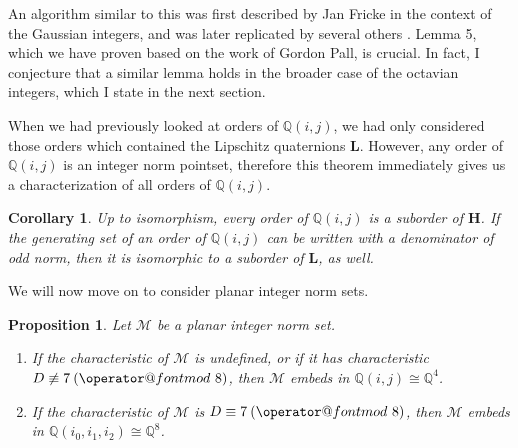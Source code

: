 \documentclass[10pt]{amsart}
\makeatletter
\newcommand{\M}{\mathcal{M}}
\newcommand{\Q}{\mathbb{Q}}
\renewcommand{\L}{\mathbf{L}}
\newcommand{\HH}{\mathbf{H}}
\newcommand{\Ord}{\mathcal{O}}
\newtheorem{prop}[thm]{Proposition}
\newtheorem{cor}[thm]{Corollary}
\DeclareRobustCommand{\pmod}{\@pmods}
\def\@pmods#1{\mkern4mu({\operator@font mod}\mkern 6mu#1)}
\makeatother
\begin{document}
An algorithm similar to this was first described by Jan Fricke \cite{Fr01} in the context of the Gaussian integers, and was later replicated by several others \cite{Kn15,Lu12, Ma13}.  Lemma 5, which we have proven based on the work of Gordon Pall, is crucial.  In fact, I conjecture that a similar lemma holds in the broader case of the octavian integers, which I state in the next section.

When we had previously looked at orders of $\Q(i,j)$, we had only considered those orders which contained the Lipschitz quaternions $\L$.  However, any order of $\Q(i,j)$ is an integer norm pointset, therefore this theorem immediately gives us a characterization of all orders of $\Q(i,j)$.

\begin{cor}
\normalfont
Up to isomorphism, every order of $\Q(i,j)$ is a suborder of $\HH$.  If the generating set of an order of $\Q(i,j)$ can be written with a denominator of odd norm, then it is isomorphic to a suborder of $\L$, as well.
\end{cor}
\begin{comment}
\begin{proof}
Let $\Ord$ be an order of $\Q(i,j)$.  By definition, $\Ord$ is generated by some finite set $\M = \{0, \alpha_1, \dots , \alpha_n\} \subseteq \Q(i,j)$ with $1 \leq n \leq 4$.  Since the pairwise differences of the elements of $\M$ are in $\Ord$, they must have integer norm, thus $\M$ is an integer norm set.  By Theorem~\ref{thm:quatemb}, there is some $\sigma \in \Q(i,j)$ for which the map $\gamma \mapsto \sigma \gamma \sigma^{-1}$ embeds $\M$ into $\HH$.  This map is an ring homomorphism and an isometry, therefore it produces an order embedding of $\Ord$ into $\HH$.
\end{proof}
\end{comment}
\noindent
We will now move on to consider planar integer norm sets.

\begin{prop} \label{prop:quatratemb}
\normalfont
Let $\M$ be a planar integer norm set.
\begin{enumerate}
\item If the characteristic of $\M$ is undefined, or if it has characteristic $D \not \equiv 7 \pmod{8}$, then $\M$ embeds in $\Q(i,j) \cong \Q^4$.
\item If the characteristic of $\M$ is $D \equiv 7 \pmod{8}$, then $\M$ embeds in $\Q(i_0,i_1,i_2) \cong \Q^8$.
\end{enumerate}
\end{prop}
\end{document}
